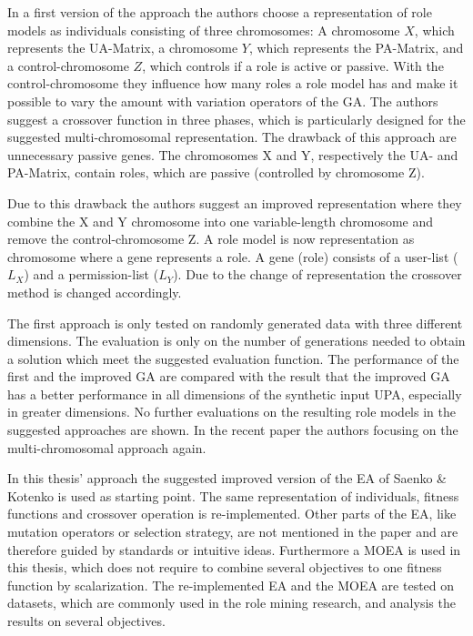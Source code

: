 In a first version of the approach the authors choose a representation of role models as individuals consisting of three chromosomes: A chromosome $X$, which represents the UA-Matrix, a chromosome $Y$, which represents the PA-Matrix, and a control-chromosome $Z$, which controls if a role is active or passive. With the control-chromosome they influence how many roles a role model has and make it possible to vary the amount with variation operators of the GA. The authors suggest a crossover function in three phases, which is particularly designed for the suggested multi-chromosomal representation. The drawback of this approach are unnecessary passive genes. The chromosomes X and Y, respectively the UA- and PA-Matrix, contain roles, which are passive (controlled by chromosome Z).

Due to this drawback the authors suggest an improved representation where they combine the X and Y chromosome into one variable-length chromosome and remove the control-chromosome Z. A role model is now representation as chromosome where a gene represents a role. A gene (role) consists of a user-list ($L_X$) and a permission-list ($L_Y$). Due to the change of representation the crossover method is changed accordingly.

The first approach is only tested on randomly generated data with three different dimensions\cite{Igor}. The evaluation is only on the number of generations needed to obtain a solution which meet the suggested evaluation function. The performance of the first and the improved GA are compared with the result that the improved GA has a better performance in all dimensions of the synthetic input UPA, especially in greater dimensions\cite{saenko2012design}. No further evaluations on the resulting role models in the suggested approaches are shown. In the recent paper \cite{Kotenko:2015} the authors focusing on the multi-chromosomal approach again.

In this thesis' approach the suggested improved version of the EA of Saenko \& Kotenko\cite{saenko2012design} is used as starting point. The same representation of individuals, fitness functions and crossover operation is re-implemented. Other parts of the EA, like mutation operators or selection strategy, are not mentioned in the paper and are therefore guided by standards or intuitive ideas. Furthermore a MOEA is used in this thesis, which does not require to combine several objectives to one fitness function by scalarization. The re-implemented EA and the MOEA are tested on datasets, which are commonly used in the role mining research, and analysis the results on several objectives.